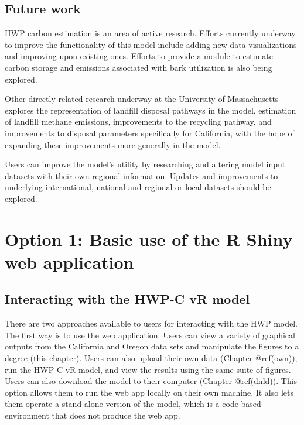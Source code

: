 \documentclass[
  openany]{book}
\begin{document}
\hypertarget{int-future}{%
\section{Future work}\label{int-future}}

HWP carbon estimation is an area of active research. Efforts currently
underway to improve the functionality of this model include adding new
data visualizations and improving upon existing ones. Efforts to provide
a module to estimate carbon storage and emissions associated with bark
utilization is also being explored.

Other directly related research underway at the University of
Massachusetts explores the representation of landfill disposal pathways
in the model, estimation of landfill methane emissions, improvements to
the recycling pathway, and improvements to disposal parameters
specifically for California, with the hope of expanding these
improvements more generally in the model.

Users can improve the model's utility by researching and altering model
input datasets with their own regional information. Updates and
improvements to underlying international, national and regional or local
datasets should be explored.

\hypertarget{app}{%
\chapter{Option 1: Basic use of the R Shiny web application}\label{app}}

\hypertarget{app-sum}{%
\section{Interacting with the HWP-C vR model}\label{app-sum}}

There are two approaches available to users for interacting with the HWP
model. The first way is to use the web application. Users can view a
variety of graphical outputs from the California and Oregon data sets
and manipulate the figures to a degree (this chapter). Users can also
upload their own data (Chapter @ref(own)), run the HWP-C vR model, and
view the results using the same suite of figures. Users can also
download the model to their computer (Chapter @ref(dnld)). This option
allows them to run the web app locally on their own machine. It also
lets them operate a stand-alone version of the model, which is a
code-based environment that does not produce the web app.
\end{document}
